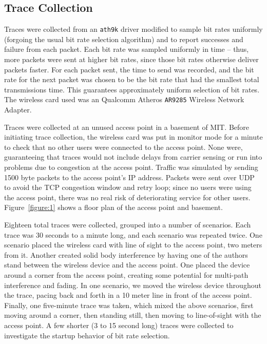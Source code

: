 \documentclass[twocolumn,10pt]{article}
\begin{document}
\subsection{Trace Collection}

Traces were collected from an \texttt{ath9k} driver modified to sample
bit rates uniformly (forgoing the usual bit rate selection algorithm)
and to report successes and failure from each packet.  Each bit rate
was sampled uniformly in time -- thus, more packets were sent at
higher bit rates, since those bit rates otherwise deliver packets
faster.  For each packet sent, the time to send was recorded, and the
bit rate for the next packet was chosen to be the bit rate that had
the smallest total transmissions time.  This guarantees approximately
uniform selection of bit rates.  The wireless card used was an
Qualcomm Atheros \texttt{AR9285} Wireless Network Adapter.

Traces were collected at an unused access point in a basement of MIT.
Before initiating trace collection, the wireless card was put in
monitor mode for a minute to check that no other users were connected
to the access point.  None were, guaranteeing that traces would not
include delays from carrier sensing or run into problems due to
congestion at the access point.  Traffic was simulated by sending 1500
byte packets to the access point's IP address.  Packets were sent over
UDP to avoid the TCP congestion window and retry loop; since no users
were using the access point, there was no real risk of deteriorating
service for other users.  Figure~\ref{figure:1} shows a floor plan of
the access point and basement.

Eighteen total traces were collected, grouped into a number of
scenarios.  Each trace was 30 seconds to a minute long, and each
scenario was repeated twice.  One scenario placed the wireless card
with line of sight to the access point, two meters from it.  Another
created solid body interference by having one of the authors stand
between the wireless device and the access point.  One placed the
device around a corner from the access point, creating some potential
for multi-path interference and fading.  In one scenario, we moved the
wireless device throughout the trace, pacing back and forth in a 10
meter line in front of the access point.  Finally, one five-minute
trace was taken, which mixed the above scenarios, first moving around
a corner, then standing still, then moving to line-of-sight with the
access point.  A few shorter (3 to 15 second long) traces were
collected to investigate the startup behavior of bit rate selection.
\end{document}
